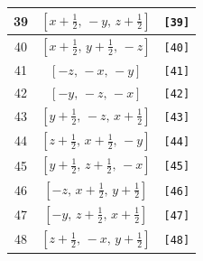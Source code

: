 \documentclass[fleqn,8pt]{jsarticle}
\begin{document}
\begin{longtable}{ccc}
39 & $\left[ x + \frac{1}{2},\, - y,\, z + \frac{1}{2} \right]$ & {\tt [39]} \\ \hline
40 & $\left[ x + \frac{1}{2},\, y + \frac{1}{2},\, - z \right]$ & {\tt [40]} \\ \hline
41 & $\left[ - z,\, - x,\, - y \right]$ & {\tt [41]} \\ \hline
42 & $\left[ - y,\, - z,\, - x \right]$ & {\tt [42]} \\ \hline
43 & $\left[ y + \frac{1}{2},\, - z,\, x + \frac{1}{2} \right]$ & {\tt [43]} \\ \hline
44 & $\left[ z + \frac{1}{2},\, x + \frac{1}{2},\, - y \right]$ & {\tt [44]} \\ \hline
45 & $\left[ y + \frac{1}{2},\, z + \frac{1}{2},\, - x \right]$ & {\tt [45]} \\ \hline
46 & $\left[ - z,\, x + \frac{1}{2},\, y + \frac{1}{2} \right]$ & {\tt [46]} \\ \hline
47 & $\left[ - y,\, z + \frac{1}{2},\, x + \frac{1}{2} \right]$ & {\tt [47]} \\ \hline
48 & $\left[ z + \frac{1}{2},\, - x,\, y + \frac{1}{2} \right]$ & {\tt [48]} \\
\end{longtable}
\end{document}
